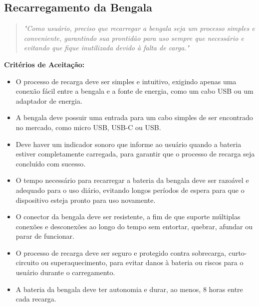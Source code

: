     \subsection{Recarregamento da Bengala}
    \begin{quote}
    \textit{"Como usuário, preciso que recarregar a bengala seja um processo simples e conveniente, garantindo sua prontidão para uso sempre que necessário e evitando que fique inutilizada devido à falta de carga."}
    \end{quote}    
    \noindent\textbf{Critérios de Aceitação:}
    \begin{itemize}
        \item O processo de recarga deve ser simples e intuitivo, exigindo apenas uma conexão fácil entre a bengala e a fonte de energia, como um cabo USB ou um adaptador de energia.
        \item A bengala deve possuir uma entrada para um cabo simples de ser encontrado no mercado, como micro USB, USB-C ou USB.
        \item Deve haver um indicador sonoro que informe ao usuário quando a bateria estiver completamente carregada, para garantir que o processo de recarga seja concluído com sucesso.
        \item O tempo necessário para recarregar a bateria da bengala deve ser razoável e adequado para o uso diário, evitando longos períodos de espera para que o dispositivo esteja pronto para uso novamente.
        \item O conector da bengala deve ser resistente, a fim de que suporte múltiplas conexões e desconexões ao longo do tempo sem entortar, quebrar, afundar ou parar de funcionar.
        \item O processo de recarga deve ser seguro e protegido contra sobrecarga, curto-circuito ou superaquecimento, para evitar danos à bateria ou riscos para o usuário durante o carregamento.
        \item A bateria da bengala deve ter autonomia e durar, ao menos, 8 horas entre cada recarga.
    \end{itemize}

